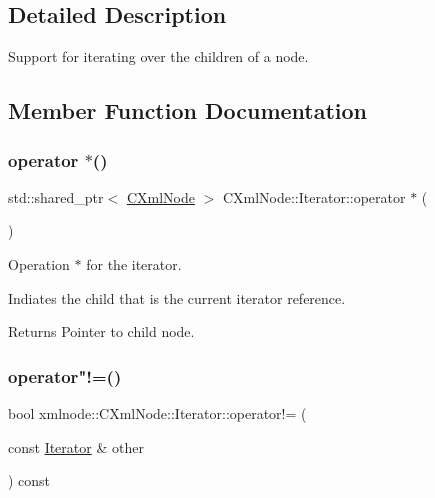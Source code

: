 \subsection{Detailed Description}
Support for iterating over the children of a node. 

\subsection{Member Function Documentation}
\mbox{\label{classxmlnode_1_1_c_xml_node_1_1_iterator_a63743812f3b36b3eff65ee5038674b45}} 
\subsubsection{\texorpdfstring{operator $\ast$()}{operator *()}}
{\footnotesize\ttfamily std\+::shared\+\_\+ptr$<$ \mbox{\hyperlink{classxmlnode_1_1_c_xml_node}{C\+Xml\+Node}} $>$ C\+Xml\+Node\+::\+Iterator\+::operator $\ast$ (\begin{DoxyParamCaption}{ }\end{DoxyParamCaption})}



Operation $\ast$ for the iterator. 

Indiates the child that is the current iterator reference.

\begin{DoxyReturn}{Returns}
Pointer to child node. 
\end{DoxyReturn}
\mbox{\label{classxmlnode_1_1_c_xml_node_1_1_iterator_a55c86e64262a6ef16e253f2aef70578c}} 
\subsubsection{\texorpdfstring{operator"!=()}{operator!=()}}
{\footnotesize\ttfamily bool xmlnode\+::\+C\+Xml\+Node\+::\+Iterator\+::operator!= (\begin{DoxyParamCaption}\item[{const \mbox{\hyperlink{classxmlnode_1_1_c_xml_node_1_1_iterator}{Iterator}} \&}]{other }\end{DoxyParamCaption}) const\hspace{0.3cm}{\ttfamily [inline]}}



